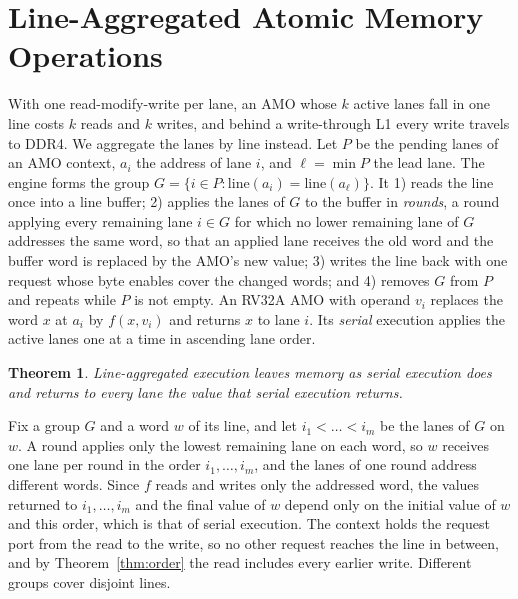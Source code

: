 \documentclass[journal]{IEEEtran}
\newtheorem{theorem}{Theorem}
\begin{document}
\section{Line-Aggregated Atomic Memory Operations}\label{sec:amo}
With one read-modify-write per lane, an AMO whose $k$ active lanes fall in one line
costs $k$ reads and $k$ writes, and behind a write-through L1 every write travels to
DDR4. We aggregate the lanes by line instead. Let $P$ be the pending lanes of an AMO
context, $a_i$ the address of lane $i$, and $\ell=\min P$ the lead lane. The engine
forms the group $G=\{i\in P:\mathrm{line}(a_i)=\mathrm{line}(a_\ell)\}$. It 1) reads
the line once into a line buffer; 2) applies the lanes of $G$ to the buffer in
\emph{rounds}, a round applying every remaining lane $i\in G$ for which no lower
remaining lane of $G$ addresses the same word, so that an applied lane receives the old
word and the buffer word is replaced by the AMO's new value; 3) writes the line back
with one request whose byte enables cover the changed words; and 4) removes $G$ from
$P$ and repeats while $P$ is not empty.
An RV32A AMO with operand $v_i$ replaces the word $x$ at $a_i$ by $f(x,v_i)$ and returns
$x$ to lane $i$. Its \emph{serial} execution applies the active lanes one at a time in
ascending lane order.

\begin{theorem}\label{thm:amo}
Line-aggregated execution leaves memory as serial execution does and returns to every
lane the value that serial execution returns.
\end{theorem}
\begin{IEEEproof}
Fix a group $G$ and a word $w$ of its line, and let $i_1<\dots<i_m$ be the lanes of $G$
on $w$. A round applies only the lowest remaining lane on each word, so $w$ receives
one lane per round in the order $i_1,\dots,i_m$, and the lanes of one round address
different words. Since $f$ reads and writes only the addressed word, the values
returned to $i_1,\dots,i_m$ and the final value of $w$ depend only on the initial value
of $w$ and this order, which is that of serial execution. The context holds the
request port from the read to the write, so no other request reaches the line in
between, and by Theorem~\ref{thm:order} the read includes every earlier write.
Different groups cover disjoint lines.
\end{IEEEproof}
\end{document}

